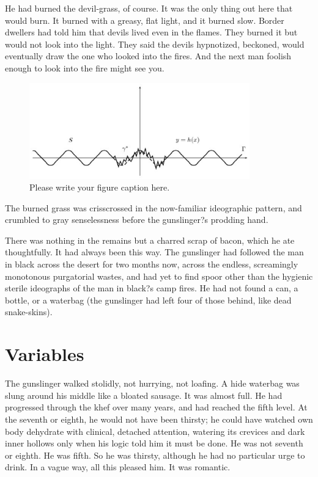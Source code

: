\documentclass[
11pt,%
tightenlines,%
twoside,%
onecolumn,%
nofloats,%
nobibnotes,%
nofootinbib,%
superscriptaddress,%
noshowpacs,%
centertags]%
{revtex4}
\begin{document}
He had burned the devil-grass, of course. It was the only thing out here that would burn. It burned with a greasy, flat light, and it burned slow. Border dwellers had told him that devils lived even in the flames. They burned it but would not look into the light. They said the devils hypnotized, beckoned, would eventually draw the one who looked into the fires. And the next man foolish enough to look into the fire might see you.

\begin{figure}[h]
\setcaptionmargin{5mm}
\onelinecaptionstrue  %
\includegraphics[width=0.85\textwidth]{deform.eps}
\caption{Please write your figure caption here.}\label{fig:1}
\end{figure}

The burned grass was crisscrossed in the now-familiar ideographic pattern, and crumbled to gray senselessness before the gunslinger?s prodding hand. 

There was nothing in the remains but a charred scrap of bacon, which he ate thoughtfully. It had always been this way. The gunslinger had followed the man in black across the desert for two months now, across the endless, screamingly monotonous purgatorial wastes, and had yet to find spoor other than the hygienic sterile ideographs of the man in black?s camp fires. He had not found a can, a bottle, or a waterbag (the gunslinger had left four of those behind, like dead snake-skins).

\section{Variables}

The gunslinger walked stolidly, not hurrying, not loafing. A hide waterbag was slung around his middle like a bloated sausage. It was almost full. He had progressed through the khef over many years, and had reached the fifth level. At the seventh or eighth, he would not have been thirsty; he could have watched own body dehydrate with clinical, detached attention, watering its crevices and dark inner hollows only when his logic told him it must be done. He was not seventh or eighth. He was fifth. So he was thirsty, although he had no particular urge to drink. In a vague way, all this pleased him. It was romantic.
\end{document}
